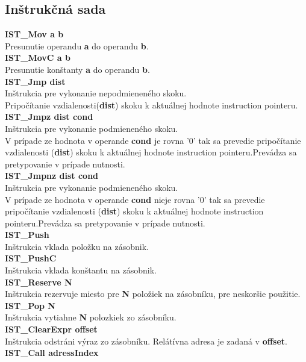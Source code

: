 \documentclass[12pt,a4paper,titlepage,final]{article}
\begin{document}
\subsection{Inštrukčná sada}

\textbf{IST\_Mov a b}\\
Presunutie operandu \textbf{a} do operandu \textbf{b}. \\
\textbf{IST\_MovC a b} \\
Presunutie konštanty \textbf{a} do operandu \textbf{b}. \\
\textbf{IST\_Jmp dist}\\
Inštrukcia pre vykonanie nepodmieneného skoku.\\
Pripočítanie vzdialenosti(\textbf{dist}) skoku k aktuálnej hodnote instruction
pointeru.\\
\textbf{IST\_Jmpz dist cond}\\
Inštrukcia pre vykonanie podmieneného skoku.\\
V prípade ze hodnota v operande \textbf{cond} je rovna '0' tak sa prevedie
pripočítanie vzdialenosti (\textbf{dist}) skoku k aktuálnej hodnote instruction
pointeru.Prevádza sa pretypovanie v prípade nutnosti.\\
\textbf{IST\_Jmpnz dist cond}\\
Inštrukcia pre vykonanie podmieneného skoku.\\
V prípade ze hodnota v operande \textbf{cond} nieje rovna '0' tak sa prevedie
pripočítanie vzdialenosti (\textbf{dist}) skoku k aktuálnej hodnote instruction
pointeru.Prevádza sa pretypovanie v prípade nutnosti.\\
\textbf{IST\_Push}\\
Inštrukcia vklada položku na zásobnik.\\
\textbf{IST\_PushC}\\
Inštrukcia vklada konštantu na zásobnik.\\
\textbf{IST\_Reserve N}\\
Inštrukcia rezervuje miesto pre \textbf{N} položiek na zásobníku, pre neskoršie
 použitie.\\
\textbf{IST\_Pop N}\\
Inštrukcia vytiahne \textbf{N} polozkiek zo zásobníku.\\
\textbf{IST\_ClearExpr offset} \\
Inštrukcia odstráni výraz zo zásobníku. Relátívna adresa je zadaná v \textbf{offset}.\\
\textbf{IST\_Call adressIndex}\\
\end{document}
